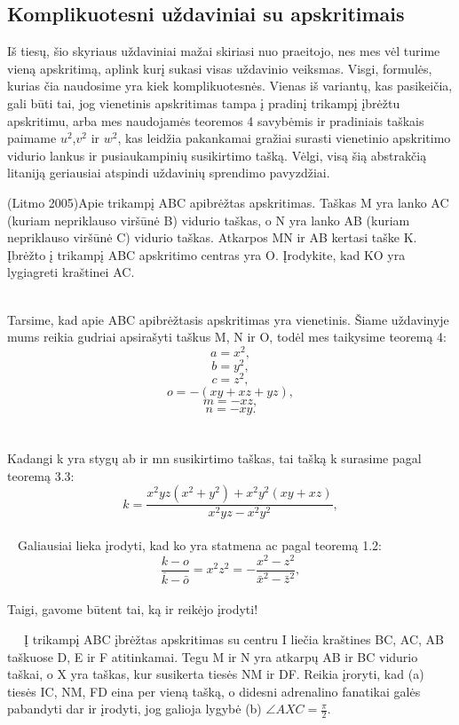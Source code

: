 \subsection{Komplikuotesni uždaviniai su apskritimais}

Iš tiesų, šio skyriaus uždaviniai mažai skiriasi nuo praeitojo, nes mes vėl turime vieną apskritimą, aplink kurį sukasi visas uždavinio veiksmas. Visgi, formulės, kurias čia naudosime yra kiek komplikuotesnės. Vienas iš variantų, kas pasikeičia, gali būti tai,  
jog vienetinis apskritimas tampa į pradinį trikampį įbrėžtu apskritimu, arba mes naudojamės
teoremos 4 savybėmis ir pradiniais taškais paimame $u^2$,$v^2$ ir $w^2$, kas leidžia
pakankamai gražiai surasti vienetinio apskritimo vidurio lankus ir pusiaukampinių susikirtimo tašką. Vėlgi, visą šią abstrakčią litaniją geriausiai atspindi uždavinių 
sprendimo pavyzdžiai.

\begin{pavnr}
(Litmo 2005)Apie trikampį ABC apibrėžtas apskritimas. Taškas M yra lanko AC (kuriam nepriklauso 
viršūnė B) vidurio taškas, o N yra lanko AB (kuriam nepriklauso viršūnė C) vidurio taškas. 
Atkarpos MN ir AB kertasi taške K. Įbrėžto į trikampį ABC apskritimo centras yra O. 
Įrodykite, kad KO yra lygiagreti kraštinei AC. 
\end{pavnr}
\begin{sprendimas}
  \\Tarsime, kad apie ABC apibrėžtasis apskritimas yra vienetinis. Šiame uždavinyje mums
reikia gudriai apsirašyti taškus M, N ir O, todėl mes taikysime teoremą 4:
\\
   $$a = x^2,$$
   $$b=y^2,$$
   $$c = z^2,$$
   $$ o = - (xy+xz+yz),$$
   $$m = - xz,$$
   $$ n = - xy.$$
    \\
  \\ Kadangi k yra stygų ab ir mn susikirtimo taškas, tai tašką k surasime pagal teoremą 3.3:
          $$k = \frac{ x^2yz(x^2+y^2)+ x^2 y^2 (xy+xz)}{ x^2 yz - x^2 y^2},$$
  \\ $\phantom{a}$ Galiausiai lieka įrodyti, kad ko yra statmena ac pagal teoremą 1.2:
     $$\frac{k-o}{\bar k - \bar o}  =  x^2 z^2 = - \frac{ x^2 - z^2}{\bar x^2 - \bar z^2},$$
\\ Taigi, gavome būtent tai, ką ir reikėjo įrodyti!
\end{sprendimas}



\begin{pavnr}
  \ $\phantom{a}$  Į trikampį ABC įbrėžtas apskritimas su centru I liečia kraštines BC, AC, AB taškuose D, E ir F atitinkamai.
    Tegu M ir N yra atkarpų AB ir BC vidurio taškai, o X yra taškas, kur susikerta tiesės NM ir DF.
   Reikia įroryti, kad  (a) tiesės IC, NM, FD eina per vieną tašką, o didesni adrenalino fanatikai galės pabandyti dar ir
    įrodyti, jog galioja lygybė (b) $\angle AXC = \frac{\pi}{2}$. 
\end{pavnr}

